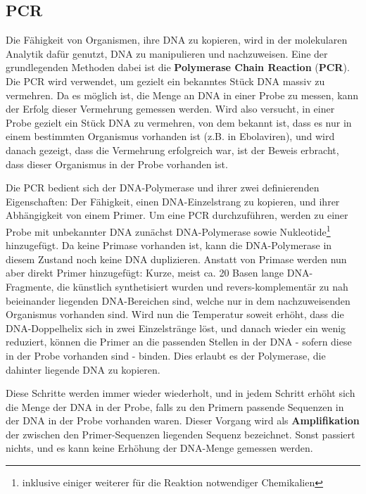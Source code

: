 \subsection{PCR}

Die Fähigkeit von Organismen, ihre DNA zu kopieren, wird in der molekularen Analytik dafür genutzt, DNA zu manipulieren und nachzuweisen. Eine der grundlegenden Methoden dabei ist die \textbf{Polymerase Chain Reaction} (\textbf{PCR}). Die PCR wird verwendet, um gezielt ein bekanntes Stück DNA massiv zu vermehren. Da es möglich ist, die Menge an DNA in einer Probe zu messen, kann der Erfolg dieser Vermehrung gemessen werden. Wird also versucht, in einer Probe gezielt ein Stück DNA zu vermehren, von dem bekannt ist, dass es nur in einem bestimmten Organismus vorhanden ist (z.B. in Ebolaviren), und wird danach gezeigt, dass die Vermehrung erfolgreich war, ist der Beweis erbracht, dass dieser Organismus in der Probe vorhanden ist. 

Die PCR bedient sich der DNA-Polymerase und ihrer zwei definierenden Eigenschaften: Der Fähigkeit, einen DNA-Einzelstrang zu kopieren, und ihrer Abhängigkeit von einem Primer. Um eine PCR durchzuführen, werden zu einer Probe mit unbekannter DNA zunächst DNA-Polymerase sowie Nukleotide\footnote{inklusive einiger weiterer für die Reaktion notwendiger Chemikalien} hinzugefügt. Da keine Primase vorhanden ist, kann die DNA-Polymerase in diesem Zustand noch keine DNA duplizieren. Anstatt von Primase werden nun aber direkt Primer hinzugefügt: Kurze, meist ca. 20 Basen lange DNA-Fragmente, die künstlich synthetisiert wurden und revers-komplementär zu nah beieinander liegenden DNA-Bereichen sind, welche nur in dem nachzuweisenden Organismus vorhanden sind. Wird nun die Temperatur soweit erhöht, dass die DNA-Doppelhelix sich in zwei Einzelstränge löst, und danach wieder ein wenig reduziert, können die Primer an die passenden Stellen in der DNA - sofern diese in der Probe vorhanden sind - binden. Dies erlaubt es der Polymerase, die dahinter liegende DNA zu kopieren.

Diese Schritte werden immer wieder wiederholt, und in jedem Schritt erhöht sich die Menge der DNA in der Probe, falls zu den Primern passende Sequenzen in der DNA in der Probe vorhanden waren. Dieser Vorgang wird als \textbf{Amplifikation} der zwischen den Primer-Sequenzen liegenden Sequenz bezeichnet. Sonst passiert nichts, und es kann keine Erhöhung der DNA-Menge gemessen werden. 
